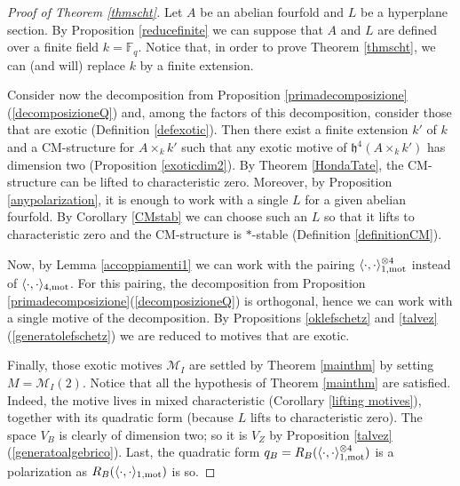\begin{proof}[Proof of Theorem \ref{thmscht}]
Let $A$ be an abelian fourfold and $L$ be a hyperplane section. By Proposition \ref{reducefinite} we can suppose that $A$ and $L$ are defined over a finite field $k=\mathbb{F}_q$. Notice that, in order to prove Theorem \ref{thmscht}, we can (and will) replace $k$ by a finite extension.

Consider now the decomposition from Proposition \ref{primadecomposizione}(\ref{decomposizioneQ}) and, among the factors of this decomposition, consider
those that are exotic (Definition \ref{defexotic}). Then there exist a finite extension $k'$ of $k$ and a  CM-structure for $A\times_k k'$ such that any exotic motive  of $\mathfrak{h}^{4}(A\times_k k')$ has dimension two (Proposition \ref{exoticdim2}).  By Theorem \ref{HondaTate}, the CM-structure can be lifted    to characteristic zero.  Moreover, by Proposition \ref{anypolarization}, it is enough to work with a single $L$ for a given abelian fourfold. By Corollary \ref{CMstab} we can choose such an $L$ so that it lifts to characteristic zero and the CM-structure is $*$-stable (Definition \ref{definitionCM}).


Now, by Lemma \ref{accoppiamenti1} we can work with the pairing $\langle \cdot, \cdot \rangle_{1,\mathrm{mot}}^{\otimes 4}$ instead of $\langle \cdot, \cdot \rangle_{4,\mathrm{mot}}$. For this pairing, the decomposition from Proposition \ref{primadecomposizione}(\ref{decomposizioneQ}) is orthogonal, hence we can work with a single motive of the decomposition. By Propositions \ref{oklefschetz} and \ref{talvez}(\ref{generatolefschetz}) we are reduced to motives that are exotic.

Finally, those exotic motives $\mathcal{M}_I$ are settled by Theorem \ref{mainthm} by setting $M=\mathcal{M}_I(2)$. Notice that all the hypothesis of Theorem \ref{mainthm} are satisfied. Indeed, the motive lives in mixed characteristic (Corollary \ref{lifting motives}), together with its quadratic form (because $L$ lifts to characteristic zero). The space $V_B$ is clearly of dimension two; so it is $V_Z$ by   Proposition  \ref{talvez}(\ref{generatoalgebrico}).  Last, the quadratic form $q_B=R_B(\langle \cdot, \cdot \rangle_{1,\mathrm{mot}}^{\otimes 4})$ is a polarization as $R_B(\langle \cdot, \cdot \rangle_{1,\mathrm{mot}})$ is so.
\end{proof}
